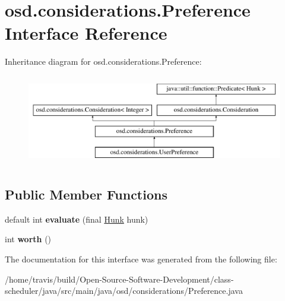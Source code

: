 \hypertarget{interfaceosd_1_1considerations_1_1_preference}{\section{osd.\-considerations.\-Preference Interface Reference}
\label{interfaceosd_1_1considerations_1_1_preference}
}
Inheritance diagram for osd.\-considerations.\-Preference\-:\begin{figure}[H]
\begin{center}
\leavevmode
\includegraphics[height=4.000000cm]{interfaceosd_1_1considerations_1_1_preference}
\end{center}
\end{figure}
\subsection*{Public Member Functions}
\begin{DoxyCompactItemize}
\item 
\hypertarget{interfaceosd_1_1considerations_1_1_preference_ad9af6831a7b789685a22037c7abdf008}{default int {\bfseries evaluate} (final \hyperlink{classosd_1_1output_1_1_hunk}{Hunk} hunk)}\label{interfaceosd_1_1considerations_1_1_preference_ad9af6831a7b789685a22037c7abdf008}

\item 
\hypertarget{interfaceosd_1_1considerations_1_1_preference_ad814027d6d3a6e773fa067299bc21456}{int {\bfseries worth} ()}\label{interfaceosd_1_1considerations_1_1_preference_ad814027d6d3a6e773fa067299bc21456}

\end{DoxyCompactItemize}


The documentation for this interface was generated from the following file\-:\begin{DoxyCompactItemize}
\item 
/home/travis/build/\-Open-\/\-Source-\/\-Software-\/\-Development/class-\/scheduler/java/src/main/java/osd/considerations/Preference.\-java\end{DoxyCompactItemize}
